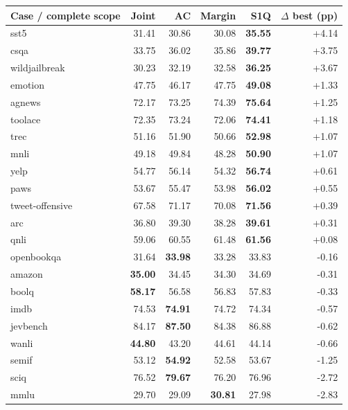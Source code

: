 \begin{tabular}{lrrrrr}
\toprule
Case / complete scope & Joint & AC & Margin & S1Q & $\Delta$ best (pp) \\
\midrule
sst5 & 31.41 & 30.86 & 30.08 & \textbf{35.55} & +4.14 \\
csqa & 33.75 & 36.02 & 35.86 & \textbf{39.77} & +3.75 \\
wildjailbreak & 30.23 & 32.19 & 32.58 & \textbf{36.25} & +3.67 \\
emotion & 47.75 & 46.17 & 47.75 & \textbf{49.08} & +1.33 \\
agnews & 72.17 & 73.25 & 74.39 & \textbf{75.64} & +1.25 \\
toolace & 72.35 & 73.24 & 72.06 & \textbf{74.41} & +1.18 \\
trec & 51.16 & 51.90 & 50.66 & \textbf{52.98} & +1.07 \\
mnli & 49.18 & 49.84 & 48.28 & \textbf{50.90} & +1.07 \\
yelp & 54.77 & 56.14 & 54.32 & \textbf{56.74} & +0.61 \\
paws & 53.67 & 55.47 & 53.98 & \textbf{56.02} & +0.55 \\
tweet-offensive & 67.58 & 71.17 & 70.08 & \textbf{71.56} & +0.39 \\
arc & 36.80 & 39.30 & 38.28 & \textbf{39.61} & +0.31 \\
qnli & 59.06 & 60.55 & 61.48 & \textbf{61.56} & +0.08 \\
openbookqa & 31.64 & \textbf{33.98} & 33.28 & 33.83 & -0.16 \\
amazon & \textbf{35.00} & 34.45 & 34.30 & 34.69 & -0.31 \\
boolq & \textbf{58.17} & 56.58 & 56.83 & 57.83 & -0.33 \\
imdb & 74.53 & \textbf{74.91} & 74.72 & 74.34 & -0.57 \\
jevbench & 84.17 & \textbf{87.50} & 84.38 & 86.88 & -0.62 \\
wanli & \textbf{44.80} & 43.20 & 44.61 & 44.14 & -0.66 \\
semif & 53.12 & \textbf{54.92} & 52.58 & 53.67 & -1.25 \\
sciq & 76.52 & \textbf{79.67} & 76.20 & 76.96 & -2.72 \\
mmlu & 29.70 & 29.09 & \textbf{30.81} & 27.98 & -2.83 \\
\bottomrule
\end{tabular}
